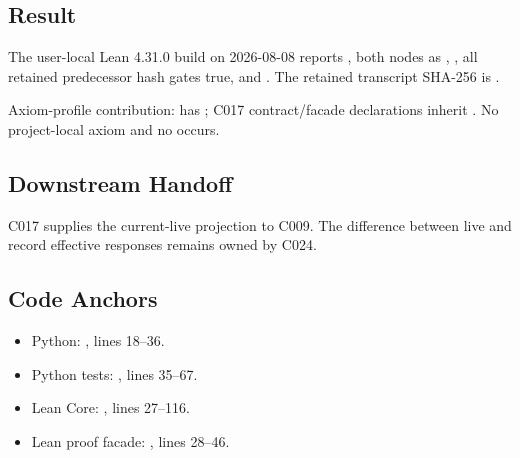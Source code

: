\subsection{Result}\label{result-28}

The user-local Lean 4.31.0 build on 2026-08-08 reports
\texttt{\protect{}}, both nodes as
\texttt{\protect{}},
\texttt{\protect{}}, all retained
predecessor hash gates true, and
\texttt{\protect{}}. The retained transcript
SHA-256 is
\texttt{\protect{}}.

Axiom-profile contribution:
\texttt{\protect{}} has
\texttt{\protect{}}; C017 contract/facade declarations
inherit \texttt{\protect{}}. No
project-local axiom and no \texttt{\protect{}} occurs.

\subsection{Downstream Handoff}\label{downstream-handoff-28}

C017 supplies the current-live projection to C009. The difference
between live and record effective responses remains owned by C024.

\subsection{Code Anchors}\label{code-anchors-18}

\begin{itemize}
\tightlist
\item
  Python:
  \texttt{\protect{}},
  lines 18--36.
\item
  Python tests: \texttt{\protect{}},
  lines 35--67.
\item
  Lean Core: \texttt{\protect{}}, lines 27--116.
\item
  Lean proof facade:
  \texttt{\protect{}}, lines
  28--46.
\end{itemize}

